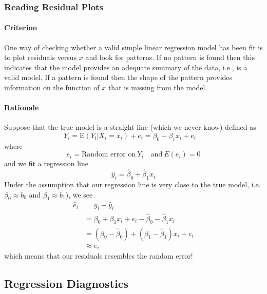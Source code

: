 \documentclass[11pt]{article}
\begin{document}
\subsubsection{Reading Residual Plots}
\paragraph{Criterion} One way of checking whether a valid simple linear regression model has been fit is to plot residuals versus $x$ and look for patterns. If no pattern is found then this indicates that the model provides an adequate summary of the data, i.e., is a valid model. If a pattern is found then the shape of the pattern provides information on the function of $x$ that is missing from the model.  

\paragraph{Rationale} Suppose that the true model is a straight line (which we never know) defined as
\begin{equation}
    Y_{i}=\mathrm{E}\left(Y_{\mathrm{i}} | X_{i}=x_{i}\right)+e_{i}=\beta_{0}+\beta_{1} x_{i}+e_{i} \quad 
\end{equation}
where
\begin{equation*}
    e_i = \text{Random error on}~Y_i\quad \text{and} ~E(e_i) = 0
\end{equation*}
and we fit a regression line
\begin{equation*}
    \hat{y}_{i}=\hat{\beta}_{0}+\hat{\beta}_{1} x_{i}
\end{equation*}
Under the assumption that our regression line is very close to the true model, i.e. $\beta_0 \approx b_0$ and $\beta_1 \approx b_1$), we see
\begin{align*}
    \hat{e}_{i} 
    &= y_{i}-\hat{y}_{i} \\
    &= \beta_{0}+\beta_{1} x_{i} + e_i - \hat{\beta}_{0} - \hat{\beta}_{1} x_{i} \\
    &= \left(\beta_{0}-\hat{\beta}_{0}\right)+\left(\beta_{1}-\hat{\beta}_{1}\right) x_{i}+e_{i} \\
    &\approx e_i
\end{align*}
which means that our residuals resembles the random error! 

\subsection{Regression Diagnostics}
\end{document}
